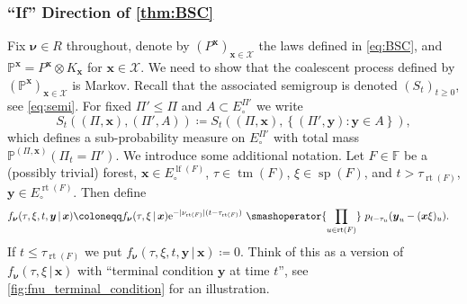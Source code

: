 \documentclass[reqno,draft]{amsart}
\numberwithin{equation}{section}
\theoremstyle{plain}
\theoremstyle{remark}
\renewcommand{\P}{\mathbb{P}} %
\newcommand{\e}{\mathrm{e}}
\newcommand{\fpart}{\Pi} %
\newcommand{\nurates}{R} %
\DeclareMathOperator{\lf}{lf}
\DeclareMathOperator{\rt}{rt}
\DeclareMathOperator{\dct}{tm}
\DeclareMathOperator{\dcs}{sp}
\newcommand{\semi}{S}
\newcommand{\smashop}[1]{\,\,\smashoperator{#1}\,\,}
\newcommand{\ftm}{f_\mathrm{tm}^{\boldsymbol \lambda}}
\newcommand{\fsp}{f_\mathrm{sp}}
\newcommand{\fnu}{f_{\boldsymbol \nu}}
\newcommand{\nut}[1]{|\nu_{#1}|}
\begin{document}
\subsubsection{``If'' Direction of \cref{thm:BSC}}
Fix $\boldsymbol \nu \in \nurates$ throughout, denote by $(P^{\boldsymbol x})_{\boldsymbol x\in \mathcal{X}}$ the laws defined in \cref{eq:BSC}, and $\P^{\boldsymbol x} = P^{\boldsymbol x} \otimes K_{\boldsymbol x}$ for $\boldsymbol x\in \mathcal{X}$. We need to show that the coalescent process defined by $(\P^{\boldsymbol x})_{\boldsymbol x\in \mathcal{X}}$ is Markov. Recall that the associated semigroup is denoted $(\semi_t)_{t\ge 0}$, see \cref{eq:semi}. For fixed $\fpart'\le \fpart$ and $A \subset E^{\fpart'}_\circ $ we write \[
    \semi_t((\fpart,\boldsymbol x),(\fpart',A)) \coloneqq \semi_t((\fpart,\boldsymbol x), \left\{ (\fpart',\boldsymbol y)\colon \boldsymbol y\in A \right\} ),
\] which defines a sub-probability measure on $E^{\fpart'}_\circ $ with total mass $\P^{(\fpart,\boldsymbol x)}(\fpart_t = \fpart')$. We introduce some additional notation. Let $F\in \mathbb{F}$ be a (possibly trivial) forest, $\boldsymbol x\in E^{\lf(F)}_\circ $, $\tau\in \dct(F)$, $\xi\in \dcs(F)$, and $t > \tau_{\rt(F)}$, $\boldsymbol y \in E^{\rt(F)}_\circ $. Then define
\begin{align}\label{eq:fnu_terminal_condition}
    \fnu(\tau,\xi,t,\boldsymbol y \,\vert\,\boldsymbol x) & \coloneqq \fnu(\tau,\xi \,\vert\,\boldsymbol x)\e^{-\nut{\rt(F)} (t-\tau_{\rt(F)})} \smashop{\prod_{u\in \rt(F)}} p_{t-\tau_u}(\boldsymbol y_u - (\boldsymbol x\xi)_u).
\end{align}
If $t \le \tau_{\rt(F)}$ we put $\fnu(\tau,\xi,t,\boldsymbol y \,\vert\,\boldsymbol x) \coloneqq 0$. Think of this as a version of $\fnu(\tau,\xi \,\vert\,\boldsymbol x)$ with ``terminal condition $\boldsymbol y$ at time $t$'', see \cref{fig:fnu_terminal_condition} for an illustration.
\end{document}
